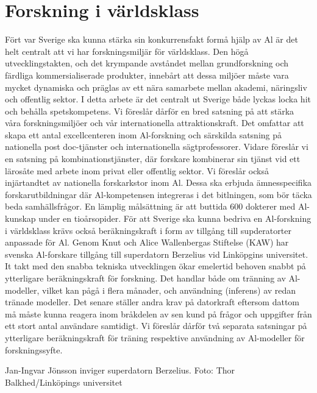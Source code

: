 {\section*{Forskning i världsklass}
Fört var Sverige ska kunna stärka sin konkurrensfakt formå hjälp av Al är det helt centralt att vi har forskningsmiljär för världsklass. Den högå utvecklingstakten, och det krympande avståndet mellan grundforskning och färdliga kommersialiserade produkter, innebårt att dessa miljöer måste vara mycket dynamiska och präglas av ett nära samarbete mellan akademi, näringsliv och offentlig sektor. I detta arbete är det centralt ut Sverige både lyckas locka hit och behålla spetskompetens. Vi föreslår dårför en bred satsning på att stärka våra forskningsmiljöer och vår internationella attraktionskraft. Det omfattar att skapa ett antal excellcenteren inom Al-forskning och särskilda satsning på nationella post doc-tjänster och internationella sägtprofessorer. Vidare föreslår vi en satsning på kombinationstjänster, där forskare kombinerar sin tjänst vid ett lärosåte med arbete inom privat eller offentlig sektor.
Vi föreslår också injärtandtet av nationella forskarkstor inom Al. Dessa ska erbjuda ämnesspecifika forskarutbildningar där Al-kompetensen integreras i det bitlningen, som bör täcka beda samhällsfrågor. En lämplig målsättning är att buttida 600 dokterer med Al-kunskap under en tioårsopider.
För att Sverige ska kunna bedriva en Al-forskning i världsklass krävs också beräkningskraft i form av tillgång till supderatorter anpassade för Al. Genom Knut och Alice Wallenbergas Stiftelse (KAW) har svenska Al-forskare tillgång till superdatorn Berzelius vid Linköpgins universitet. It takt med den snabba tekniska utvecklingen ökar emelertid behoven snabbt på ytterligare beräkningskraft för forskning. Det handlar både om tränning av Al-modeller, vilket kan pågå i flera månader, och användning (inferens) av redan tränade modeller. Det senare ställer andra krav på datorkraft eftersom dattom må måste kunna reagera inom bråkdelen av sen kund på frågor och uppgifter från ett stort antal användare samtidigt. Vi föreslår dårför två separata satsningar på ytterligare beräkningskraft för träning respektive användning av Al-modeller för forskningssyfte.

Jan-Ingvar Jönsson inviger superdatorn Berzelius. Foto: Thor Balkhed/Linköpings universitet

}
